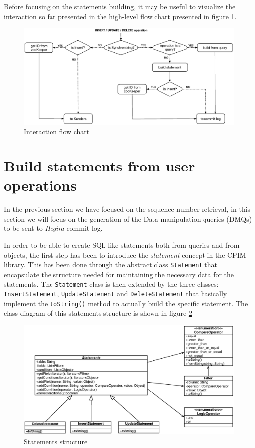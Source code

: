 \newparagraph Before focusing on the statements building, it may be useful to visualize the interaction so far presented in the high-level flow chart presented in figure \ref{fig:flow-chart}.

\begin{figure}[tbh]
  \centering
  \includegraphics[width=13.5cm]{images/flow_chart}
  \caption{Interaction flow chart}
  \label{fig:flow-chart}
\end{figure} 

\section{Build statements from user operations}
\label{sec:statements}
In the previous section we have focused on the sequence number retrieval, in this section we will focus on the generation of the Data manipulation queries (DMQs) to be sent to \textit{Hegira} commit-log.

\newparagraph In order to be able to create SQL-like statements both from queries and from objects, the first step has been to introduce the \textit{statement} concept in the CPIM library. This has been done through the abstract class \texttt{Statement} that encapsulate the structure needed for maintaining the necessary data for the statements.
The \texttt{Statement} class is then extended by the three classes: \texttt{InsertStatement}, \texttt{UpdateStatement} and \texttt{DeleteStatement} that basically implement the \texttt{toString()} method to actually build the specific statement.
The class diagram of this statements structure is shown in figure \ref{fig:statements}

\begin{figure}[tbh]
  \centering
  \includegraphics[width=13cm]{images/statements}
  \caption{Statements structure}
  \label{fig:statements}
\end{figure} 


